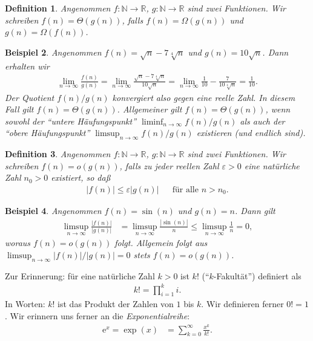 \documentclass[10pt,reqno]{amsart}
\numberwithin{equation}{section}
\newcommand\NN{\mathbb N}
\newcommand\RR{\mathbb R}
\newtheorem{definition}{Definition}[section]
\newtheorem{example}[definition]{Beispiel}
\newcommand\eul{\mathrm{e}}
\newcommand\eps{\varepsilon}
\begin{document}
\begin{definition}\label{def_Theta}
	Angenommen $f:\NN\to\RR$, $g:\NN\to\RR$ sind zwei Funktionen.
	Wir schreiben $f(n)=\Theta(g(n))$, falls $f(n)=\Omega(g(n))$ und $g(n)=\Omega(f(n))$.
\end{definition}

\begin{example}\upshape
	Angenommen $f(n)=\sqrt n-7\sqrt[4]n$ und $g(n)=10\sqrt n$.
Dann erhalten wir
\begin{align*}
	\lim_{n\to\infty}\frac{f(n)}{g(n)}=\lim_{n\to\infty}\frac{\sqrt n-7\sqrt[4]n}{10\sqrt n}=\lim_{n\to\infty}\frac1{10}-\frac7{10\sqrt[4]n}=\frac1{10}.
\end{align*}
Der Quotient $f(n)/g(n)$ konvergiert also gegen eine reelle Zahl.
In diesem Fall gilt $f(n)=\Theta(g(n))$.
Allgemeiner gilt $f(n)=\Theta(g(n))$, wenn sowohl der ``untere H\"aufungspunkt'' $\liminf_{n\to\infty}f(n)/g(n)$ als auch der ``obere H\"aufungspunkt'' $\limsup_{n\to\infty}f(n)/g(n)$ existieren (und endlich sind).
\end{example}

\begin{definition}\label{def_o}
	Angenommen $f:\NN\to\RR$, $g:\NN\to\RR$ sind zwei Funktionen.
	Wir schreiben $f(n)=o(g(n))$, falls zu jeder reellen Zahl $\eps>0$ eine nat\"urliche Zahl $n_0>0$ existiert, so da\ss\
	\begin{align*}|f(n)|\leq\eps|g(n)|&&\mbox{f\"ur alle }n>n_0.\end{align*}
\end{definition}

\begin{example}\upshape
	Angenommen $f(n)=\sin(n)$ und $g(n)=n$.
	Dann gilt
	\begin{align*}
		\limsup_{n\to\infty}\frac{|f(n)|}{|g(n)|}&=\limsup_{n\to\infty}\frac{|\sin(n)|}{n}\leq\limsup_{n\to\infty}\frac1n=0,
	\end{align*}
	woraus $f(n)=o(g(n))$ folgt.
	Allgemein folgt aus $\limsup_{n\to\infty}|f(n)|/|g(n)|=0$ stets $f(n)=o(g(n))$.
\end{example}

Zur Erinnerung: f\"ur eine nat\"urliche Zahl $k>0$ ist $k!$ (``$k$-Fakult\"at'') definiert als
\begin{align*}
	k!=\prod_{i=1}^ki.
\end{align*}
In Worten: $k!$ ist das Produkt der Zahlen von $1$ bis $k$.
Wir definieren ferner $0!=1$.
Wir erinnern uns ferner an die {\em Exponentialreihe}:
\begin{align*}
	\eul^x=\exp(x)&=\sum_{k=0}^\infty\frac{x^k}{k!}.
\end{align*}
\end{document}
